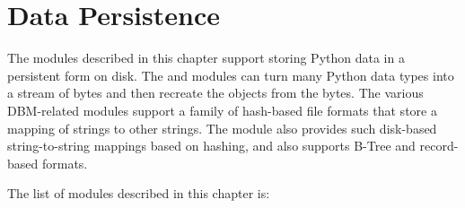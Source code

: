 \chapter{Data Persistence}
\label{persistence}

The modules described in this chapter support storing Python data in a
persistent form on disk.  The  and 
modules can turn many Python data types into a stream of bytes and
then recreate the objects from the bytes.  The various DBM-related
modules support a family of hash-based file formats that store a
mapping of strings to other strings.  The  module also
provides such disk-based string-to-string mappings based on hashing,
and also supports B-Tree and record-based formats.

The list of modules described in this chapter is:

\localmoduletable
